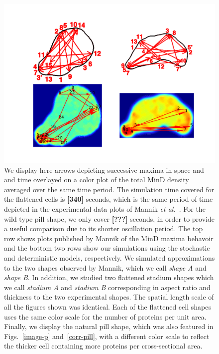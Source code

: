 \documentclass[letterpaper,twocolumn,amsmath,amssymb,pre]{revtex4-1}
\newcommand{\red}[1]{{\bf \color{red} #1}}
\newcommand{\fixme}[1]{\red{[#1]}}
\begin{document}
\begin{figure}
  \centering
  \includegraphics[width=\textwidth]{../paper/plot-ave}
  \caption{We display here arrows depicting successive maxima in space
    and and time overlayed on a color plot of the total MinD density
    averaged over the same time period.  The simulation time covered
    for the flattened cells is \fixme{340} seconds, which is the same
    period of time depicted in the experimental data plots of Mannik
    \emph{et al.}~\cite{mannik2012robustness}.  For the wild type pill
    shape, we only cover \fixme{???} seconds, in order to provide a
    useful comparison due to its shorter oscillation period.  The top
    row shows plots published by Mannik of the MinD maxima behavoir
    and the bottom two rows show our simulations using the stochastic
    and deterministic models, respectively.  We simulated
    approximations to the two shapes observed by Mannik, which we call
    \emph{shape A} and \emph{shape B}.  In addition, we studied two
    flattened stadium shapes which we call \emph{stadium A} and
    \emph{stadium B} corresponding in aspect ratio and thickness to
    the two experimental shapes.  The spatial length scale of all the
    figures shown was identical. Each of the flattened cell shapes
    uses the same color scale for the number of proteins per unit
    area.  Finally, we display the natural pill shape, which was also
    featured in Figs.~\ref{image-p} and~\ref{corr-pill}, with a
    different color scale to reflect the thicker cell containing more
    proteins per cross-sectional area.  }
  \label{randst-plot-ave}
\end{figure}
\end{document}
